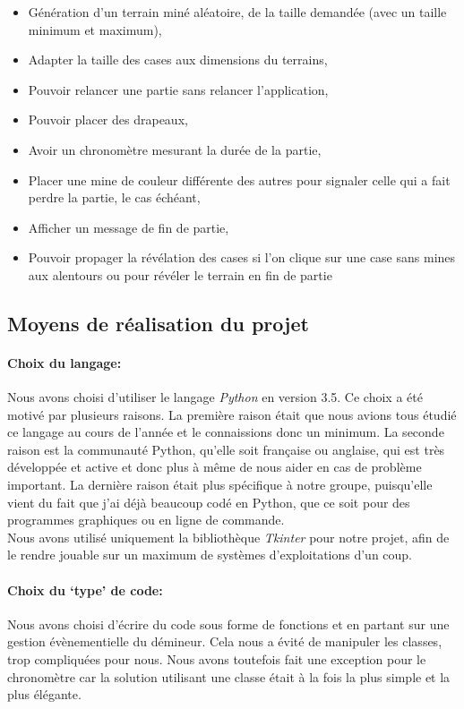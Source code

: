 \documentclass[12pt, a4paper]{article}
\begin{document}
\begin{itemize}
\item Génération d'un terrain miné aléatoire, de la taille demandée
(avec un taille minimum et maximum),
\item Adapter la taille des cases aux dimensions du terrains,
\item Pouvoir relancer une partie sans relancer l'application,
\item Pouvoir placer des drapeaux,
\item Avoir un chronomètre mesurant la durée de la partie,
\item Placer une mine de couleur différente des autres pour signaler celle qui
a fait perdre la partie, le cas échéant,
\item Afficher un message de fin de partie,
\item Pouvoir propager la révélation des cases si l'on clique sur une case sans
mines aux alentours ou pour révéler le terrain en fin de partie
\end{itemize}


\subsection{Moyens de réalisation du projet}

\paragraph{Choix du langage:}
Nous avons choisi d'utiliser le langage \emph{Python} en version 3.5. Ce choix
a été motivé par plusieurs raisons. La première raison était que nous avions
tous étudié ce langage au cours de l'année et le connaissions donc un minimum.
La seconde raison est la communauté Python, qu'elle soit française ou anglaise,
qui est très développée et active et donc plus à même de nous aider en cas
de problème important. La dernière raison était plus spécifique à notre groupe,
puisqu'elle vient du fait que j'ai déjà beaucoup codé en Python, que ce soit
pour des programmes graphiques ou en ligne de commande. \\
Nous avons utilisé uniquement la bibliothèque \emph{Tkinter} pour notre projet,
afin de le rendre jouable sur un maximum de systèmes d'exploitations d'un coup.

\paragraph{Choix du `type' de code:}
Nous avons choisi d'écrire du code sous forme de fonctions et en partant sur
une gestion évènementielle du démineur. Cela nous a évité de manipuler les
classes, trop compliquées pour nous. Nous avons toutefois fait une exception
pour le chronomètre car la solution utilisant une classe était à la fois la
plus simple et la plus élégante.
\end{document}
